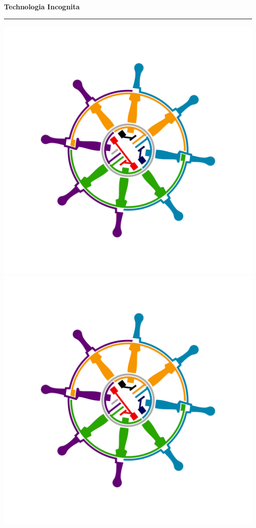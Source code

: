 \documentclass{invoice} %
\begin{document}

\hfil{\Large\bf Technologia Incognita}\hfil %
\bigskip\break %
\hrule %

\vspace{-10em}
\hspace{-2em}
\includegraphics[scale=0.6]{techinc.png}
\hspace{25em}
\includegraphics[scale=0.6]{techinc.png}
\end{document}
